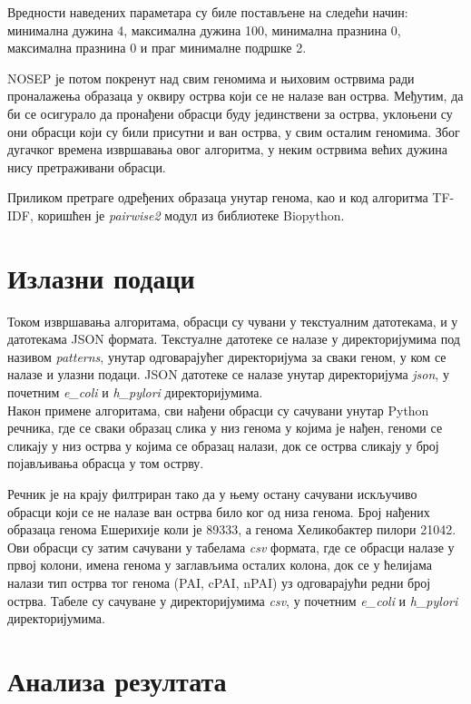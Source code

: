 \documentclass[12pt]{article}
\begin{document}
Вредности наведених параметара су биле постављене на следећи начин: минимална дужина 4, максимална дужина 100, минимална празнина 0, максимална празнина 0 и праг минималне подршке 2.

NOSEP је потом покренут над свим геномима и њиховим острвима ради проналажења образаца у оквиру острва који се не налазе ван острва. Међутим, да би се осигурало да пронађени обрасци буду јединствени за острва, уклоњени су они обрасци који су били присутни и ван острва, у свим осталим геномима. Због дугачког времена извршавања овог алгоритма, у неким острвима већих дужина нису претраживани обрасци.

Приликом претраге одређених образаца унутар генома, као и код алгоритма TF-IDF, коришћен је \textit{pairwise2} модул из библиотеке Biopython.


\section{Излазни подаци}

Током извршавања алгоритама, обрасци су чувани у текстуалним датотекама, и у датотекама JSON формата. Текстуалне датотеке се налазе у директоријумима под називом \textit{patterns}, унутар одговарајућег директоријума за сваки геном, у ком се налазе и улазни подаци. JSON датотеке се налазе унутар директоријума \textit{json}, у почетним \textit{e\_coli} и \textit{h\_pylori} директоријумима. \\

Након примене алгоритама, сви нађени обрасци су сачувани унутар Python речника, где се сваки образац слика у низ генома у којима је нађен, геноми се сликају у низ острва у којима се образац налази, док се острва сликају у број појављивања обрасца у том острву.

Речник је на крају филтриран тако да у њему остану сачувани искључиво обрасци који се не налазе ван острва било ког од низа генома. Број нађених образаца генома Ешерихије коли је 89333, а генома Хеликобактер пилори 21042. Ови обрасци су затим сачувани у табелама \textit{csv} формата, где се обрасци налазе у првој колони, имена генома у заглављима осталих колона, док се у ћелијама налази тип острва тог генома (PAI, cPAI, nPAI) уз одговарајући редни број острва. Табеле су сачуване у директоријумима \textit{csv}, у почетним \textit{e\_coli} и \textit{h\_pylori} директоријумима.

\newpage

\section{Анализа резултата}
\end{document}
